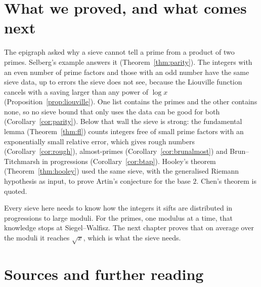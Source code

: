 \section{What we proved, and what comes next}

The epigraph asked why a sieve cannot tell a prime from a product of two primes. Selberg's example answers it (Theorem~\ref{thm:parity}). The integers with an even number of prime factors and those with an odd number have the same sieve data, up to errors the sieve does not see, because the Liouville function cancels with a saving larger than any power of $\log x$ (Proposition~\ref{prop:liouville}). One list contains the primes and the other contains none, so no sieve bound that only uses the data can be good for both (Corollary~\ref{cor:parity}). Below that wall the sieve is strong: the fundamental lemma (Theorem~\ref{thm:fl}) counts integers free of small prime factors with an exponentially small relative error, which gives rough numbers (Corollary~\ref{cor:rough}), almost-primes (Corollary~\ref{cor:brunalmost}) and Brun--Titchmarsh in progressions (Corollary~\ref{cor:btap}). Hooley's theorem (Theorem~\ref{thm:hooley}) used the same sieve, with the generalised Riemann hypothesis as input, to prove Artin's conjecture for the base $2$. Chen's theorem is quoted.

Every sieve here needs to know how the integers it sifts are distributed in progressions to large moduli. For the primes, one modulus at a time, that knowledge stops at Siegel--Walfisz. The next chapter proves that on average over the moduli it reaches $\sqrt x$, which is what the sieve needs.

\section*{Sources and further reading}

